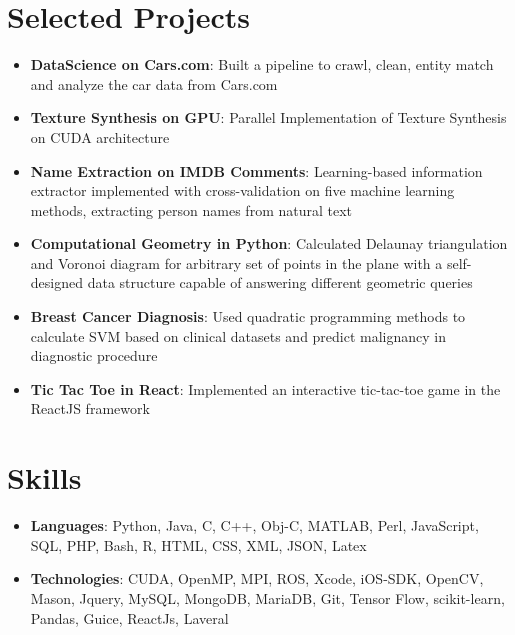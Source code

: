 \documentclass[a4paper,11pt]{article}
\newcommand{\projectItem}[2]{
	\item\small{
    \textbf{#1}{: #2 \vspace{-6pt}}
  }
}
\newcommand{\skillItem}[2]{
	\item\small{
    \textbf{#1}{: #2 \vspace{-5pt}}
  }
}
\newcommand{\sectionStart}{\begin{itemize}[leftmargin=*]}
\newcommand{\sectionEnd}{\end{itemize}}
\begin{document}
\section{Selected Projects}
	\sectionStart
		\projectItem{DataScience on Cars.com}
		{Built a pipeline to crawl, clean, entity match and analyze the car data from Cars.com}
		\projectItem{Texture Synthesis on GPU}
		{Parallel Implementation of Texture Synthesis on CUDA architecture}
		\projectItem{Name Extraction on IMDB Comments}
		{Learning-based information extractor implemented with cross-validation on five machine learning methods, extracting person names from natural text}
		\projectItem{Computational Geometry in Python}
		{Calculated Delaunay triangulation and Voronoi diagram for arbitrary set of points in the plane with a self-designed data structure capable of answering different geometric queries}
		\projectItem{Breast Cancer Diagnosis}
		{Used quadratic programming methods to calculate SVM based on clinical datasets and predict malignancy in diagnostic procedure}
		\projectItem{Tic Tac Toe in React}
		{Implemented an interactive tic-tac-toe game in the ReactJS framework}
	\sectionEnd

\section{Skills}
	\sectionStart
		\skillItem{Languages}
		{Python, Java, C, C++, Obj-C, MATLAB, Perl, JavaScript, SQL, PHP, Bash, R, HTML, CSS, XML, JSON, Latex}
		\skillItem{Technologies}
		{CUDA, OpenMP, MPI, ROS, Xcode, iOS-SDK, OpenCV, Mason, Jquery, MySQL, MongoDB, MariaDB, Git, Tensor Flow, scikit-learn, Pandas, Guice, ReactJs, Laveral}
	\sectionEnd
\end{document}
